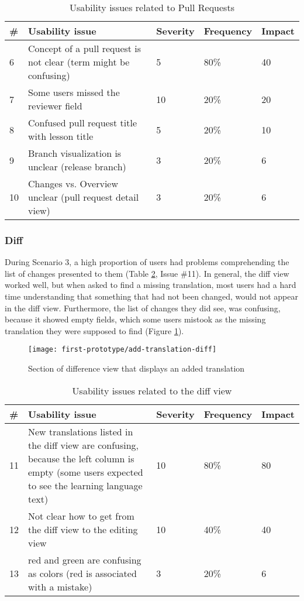 \begin{table}[h!]
\centering
\begin{tabular}{|l|p{7cm}|l|l|l|}
\hline
\rowcolor[HTML]{EFEFEF}
\textbf{\#} & \textbf{Usability issue} & \textbf{Severity} & \textbf{Frequency} & \textbf{Impact} \\ \hline
6 & Concept of a pull request is not clear (term might be confusing) & 5 & 80\% & 40 \\ \hline
7 & Some users missed the reviewer field & 10 & 20\% & 20 \\ \hline
8 & Confused pull request title with lesson title & 5 & 20\% & 10 \\ \hline
9 & Branch visualization is unclear (release branch) & 3 & 20\% & 6 \\ \hline
10 & Changes vs. Overview unclear (pull request detail view) & 3 & 20\% & 6 \\ \hline
\end{tabular}
\caption{Usability issues related to Pull Requests}
\label{table:issues-pull-requests}
\end{table}

\subsubsection{Diff}
During Scenario 3, a high proportion of users had problems comprehending the list of changes presented to them (Table \ref{table:issues-diff}, Issue \#11). In general, the diff view worked well, but when asked to find a missing translation, most users had a hard time understanding that something that had not been changed, would not appear in the diff view. Furthermore, the list of changes they did see, was confusing, because it showed empty fields, which some users mistook as the missing translation they were supposed to find (Figure \ref{fig:add-translation-diff}).

\begin{figure}[h!]
 \centering
 \texttt{[image: first-prototype/add-translation-diff]}
 \caption{Section of difference view that displays an added translation}
 \label{fig:add-translation-diff}
\end{figure}

\begin{table}[h!]
\centering
\begin{tabular}{|l|p{7cm}|l|l|l|}
\hline
\rowcolor[HTML]{EFEFEF}
\textbf{\#} & \textbf{Usability issue} & \textbf{Severity} & \textbf{Frequency} & \textbf{Impact} \\ \hline
11 & New translations listed in the diff view are confusing, because the left column is empty (some users expected to see the learning language text) & 10 & 80\% & 80 \\ \hline
12 & Not clear how to get from the diff view to the editing view & 10 & 40\% & 40 \\ \hline
13 & red and green are confusing as colors (red is associated with a mistake) & 3 & 20\% & 6 \\ \hline
\end{tabular}
\caption{Usability issues related to the diff view}
\label{table:issues-diff}
\end{table}



